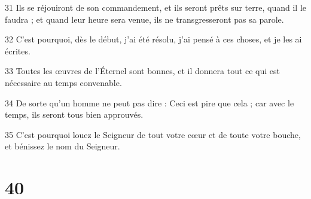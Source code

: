 \par 31 Ils se réjouiront de son commandement, et ils seront prêts sur terre, quand il le faudra ; et quand leur heure sera venue, ils ne transgresseront pas sa parole.
\par 32 C'est pourquoi, dès le début, j'ai été résolu, j'ai pensé à ces choses, et je les ai écrites.
\par 33 Toutes les œuvres de l'Éternel sont bonnes, et il donnera tout ce qui est nécessaire au temps convenable.
\par 34 De sorte qu'un homme ne peut pas dire : Ceci est pire que cela ; car avec le temps, ils seront tous bien approuvés.
\par 35 C'est pourquoi louez le Seigneur de tout votre cœur et de toute votre bouche, et bénissez le nom du Seigneur.

\chapter{40}

